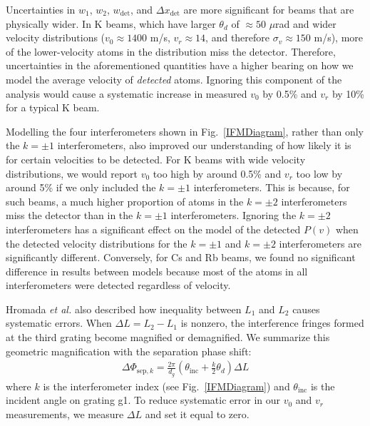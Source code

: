 \documentclass[twocolumn,prl,showpacs,superscriptaddress,longbibliography]{revtex4-1}   %
\newcommand{\figref}[1]{Fig.~\ref{#1}}
\newcommand{\dphisepk}{\Delta\Phi_{\mathrm{sep},k}}
\newcommand{\etalspace}{\textit{et al. }}
\begin{document}
Uncertainties in $w_1$, $w_2$, $w_{\mathrm{det}}$, and $\Delta x_{\mathrm{det}}$ are more significant for beams that are physically wider. 
In K beams, which have larger $\theta_d$ of $\approx 50$ $\mu$rad and wider velocity distributions 
($v_0 \approx 1400$ m/s, $v_r \approx 14$, and therefore $\sigma_v \approx 150$ m/s), more of the lower-velocity atoms in the distribution miss the detector. Therefore, uncertainties in the aforementioned quantities have a higher bearing on how we model the average velocity of \textit{detected} atoms.
Ignoring this component of the analysis would cause a systematic increase in measured $v_0$ by 0.5\% and $v_r$ by 10\% for a typical K beam.

Modelling the four interferometers shown in \figref{IFMDiagram}, rather than only the $k=\pm1$ interferometers, also improved our understanding of how likely it is for certain velocities to be detected. For K beams with wide velocity distributions, 
we would report $v_0$ too high by around 0.5\% and $v_r$ too low by around 5\% if we only included the $k=\pm 1$ interferometers.
This is because, for such beams, a much higher proportion of atoms in the $k=\pm2$ interferometers miss the detector than in the $k=\pm1$ interferometers. 
Ignoring the $k=\pm 2$ interferometers has a significant effect on the model of the detected $P(v)$ when the detected velocity distributions for the $k=\pm1$ and $k=\pm2$ interferometers are significantly different.
Conversely, for Cs and Rb beams, we found no significant difference in results between models because most of the atoms in all interferometers were detected regardless of velocity.

Hromada \etalspace \cite{Hromada2014} also described how inequality between $L_1$ and $L_2$ causes systematic errors. 
When $\Delta L = L_2 - L_1$ is nonzero, the interference fringes formed at the third grating become magnified or demagnified.
We summarize this geometric magnification with the separation phase shift:
\begin{align}
	\dphisepk = \frac{2\pi}{d_g}
	\left(
		\theta_{\mathrm{inc}} + \frac{k}{2}\theta_d
	\right) \Delta L
	\label{phiSep}
\end{align}
where $k$ is the interferometer index (see \figref{IFMDiagram}) and $\theta_{\mathrm{inc}}$ is the incident angle on grating g1. 
To reduce systematic error in our $v_0$ and $v_r$ measurements, 
we measure $\Delta L$ and set it equal to zero.
\end{document}
